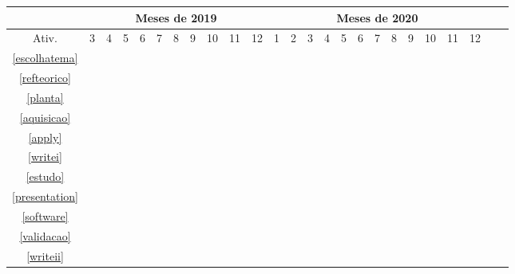 \begin{table}[!htbp]
	\centering
		\begin{tabular}{|c|c|c|c|c|c|c|c|c|c|c|c|c|c|c|c|c|c|c|c|c|c|c|c|c|}
		\hline
		&\multicolumn{10}{c|}{Meses de 2019} & \multicolumn{12}{c|}{Meses de 2020}\\
		\hline
		Ativ. & 3 & 4 & 5 & 6 & 7 & 8 & 9 & 10 & 11 & 12 & 1& 2 & 3 & 4 & 5 & 6 & 7 & 8 & 9 & 10 & 11 & 12\\
		\hline
		\ref{escolhatema}&\multicolumn{1}{c|}{\cellcolor{midgray}}&&&&&&&&&&&&&&&&&&&&&\\
		\hline
		\ref{refteorico}&&\multicolumn{3}{c|}{\cellcolor{midgray}}&&&&&&&&&&&&&&&&&&\\
		\hline
		\ref{planta}&&&&\multicolumn{2}{c|}{\cellcolor{midgray}}&&&&&&&&&&&&&&&&&\\
		\hline
		\ref{aquisicao}&&&&&&\multicolumn{1}{c|}{\cellcolor{midgray}}&&&&&&&&&&&&&&&&\\
		\hline
		\ref{apply}&&&&&&&\multicolumn{1}{c|}{\cellcolor{midgray}}&&&&&&&&&&&&&&&\\
		\hline
		\ref{writei}&&&&&&&\multicolumn{5}{c|}{\cellcolor{midgray}}&&&&&&&&&&&\\
		\hline
		\ref{estudo}&&&&&&&&&&&&\multicolumn{2}{c|}{\cellcolor{midgray}}&&&&&&&&&\\
		\hline	
		\ref{presentation}&&&&&&&&&&&&&\multicolumn{1}{c|}{\cellcolor{midgray}}&&&&&&&&&\\
		\hline
		\ref{software}&&&&&&&&&&&&&&\multicolumn{5}{c|}{\cellcolor{midgray}}&&&&\\
		\hline
		\ref{validacao}&&&&&&&&&&&&&&&&&&\multicolumn{2}{c|}{\cellcolor{midgray}}&&&\\
		\hline	
		\ref{writeii}&&&&&&&&&&&&&&&&&&\multicolumn{5}{c|}{\cellcolor{midgray}}\\
		\hline
		\end{tabular}
\end{table}